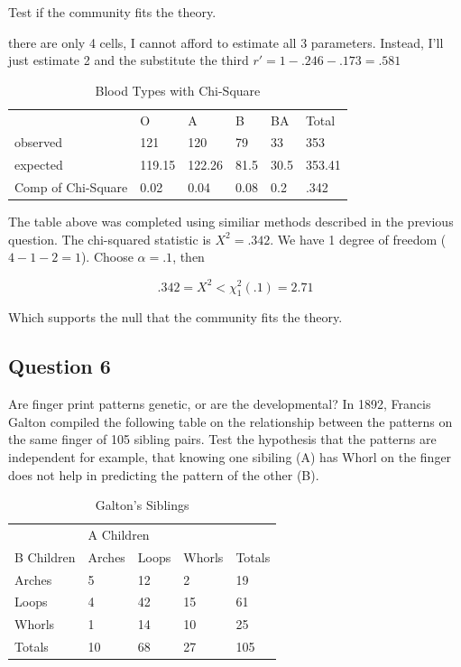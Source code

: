 \documentclass{tufte-book}
\theoremstyle{mytheoremstyle}
\theoremstyle{mylemstyle}
\theoremstyle{mydefstyle}
\begin{document}
Test if the community fits the theory. 

 there are only 4 cells, I cannot afford to estimate all 3 parameters.  Instead, I'll just estimate 2 and the substitute the third $r'= 1- .246 -.173 = .581$



\begin{table}
\centering
\caption{Blood Types with Chi-Square}
\label{blod2}
\begin{tabular}{l|lllll}
                   & O      & A      & B    & BA   & Total  \\ \cline{2-6}
observed           & 121    & 120    & 79   & 33   & 353    \\
expected           & 119.15 & 122.26 & 81.5 & 30.5 & 353.41 \\
Comp of Chi-Square &0.02&0.04&0.08&0.2&.342\\
\end{tabular}
\end{table}

The table above was completed using similiar methods described in the previous question.  The chi-squared statistic is $X^2 = .342$.  We have 1 degree of freedom ($4-1-2 = 1$).  Choose $\alpha=.1$, then

\[ .342 = X^2 < \chi_1^2(.1) = 2.71 \]

Which supports the null that the community fits the theory.


\subsection{Question 6}
Are finger print patterns genetic, or are the developmental?  In 1892, Francis Galton compiled the following table on the relationship between the patterns on the same finger of 105 sibling pairs.  Test the hypothesis that the patterns are independent for example, that knowing one sibiling (A) has Whorl on the finger does not help in predicting the pattern of the other (B).

\begin{table}
\centering
\caption{Galton's Siblings}
\label{galton}
\begin{tabular}{l|lll|l}
           & \multicolumn{3}{l}{A Children}                                    &        \\
B Children & \multicolumn{1}{l|}{Arches} & \multicolumn{1}{l|}{Loops} & Whorls & Totals \\ \hline
Arches     & \multicolumn{1}{l|}{5}      & \multicolumn{1}{l|}{12}    & 2      & 19     \\ \hline
Loops      & \multicolumn{1}{l|}{4}      & \multicolumn{1}{l|}{42}    & 15     & 61     \\ \hline
Whorls     & \multicolumn{1}{l|}{1}      & \multicolumn{1}{l|}{14}    & 10     & 25     \\ \hline
Totals     & \multicolumn{1}{l|}{10}     & \multicolumn{1}{l|}{68}    & 27     & 105    \\ \hline
\end{tabular}
\end{table}
\end{document}
